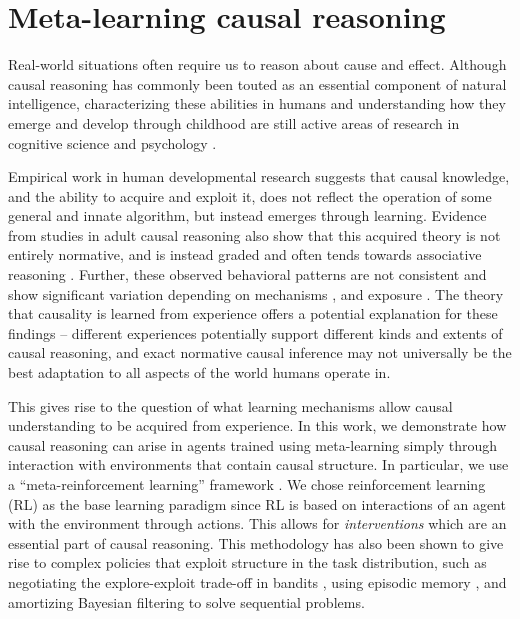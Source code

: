 \section{Meta-learning causal reasoning}

Real-world situations often require us to reason about cause and effect. Although causal reasoning has commonly been touted as an essential component of natural intelligence, characterizing these abilities in humans and understanding how they emerge and develop through childhood are still active areas of research in cognitive science and psychology \citep{waldmann2013causal, cartwright2004causation}. 

Empirical work in human developmental research suggests that causal knowledge, and the ability to acquire and exploit it, does not reflect the operation of some general and innate algorithm, but instead emerges through learning\citep{saxe2006perception, meltzoff2007infants, bonawitz2010just, carey2009origin}. Evidence from studies in adult causal reasoning also show that this acquired theory is not entirely normative, and is instead graded and often tends towards associative reasoning \citep{rehder2014independence, rehder2017failures, fernbach2010neglect, fernbach2013cognitive}. Further, these observed behavioral patterns are not consistent and show significant variation depending on mechanisms \citep{lombrozo2010causal}, and exposure \citep{krynski2007role}. The theory that causality is learned from experience offers a potential explanation for these findings -- different experiences potentially support different kinds and extents of causal reasoning, and exact normative causal inference may not universally be the best adaptation to all aspects of the world humans operate in.

This gives rise to the question of what learning mechanisms allow causal understanding to be acquired from experience. In this work, we demonstrate how causal reasoning can arise in agents trained using meta-learning
simply through interaction with environments that contain causal structure. In particular, we use a ``meta-reinforcement learning'' framework \citep{duan2016RL2,wang2016}. We chose reinforcement learning (RL) as the base learning paradigm since RL is based on interactions of an agent with the environment through actions. This allows for \textit{interventions} which are an essential part of causal reasoning. This methodology has also been shown to give rise to complex policies that exploit structure in the task distribution, such as negotiating the explore-exploit trade-off in bandits \citep{wang2016, wang2018}, using episodic memory \citep{ritter2018been}, and amortizing Bayesian filtering to solve sequential problems\citep{ortega2019meta}.

